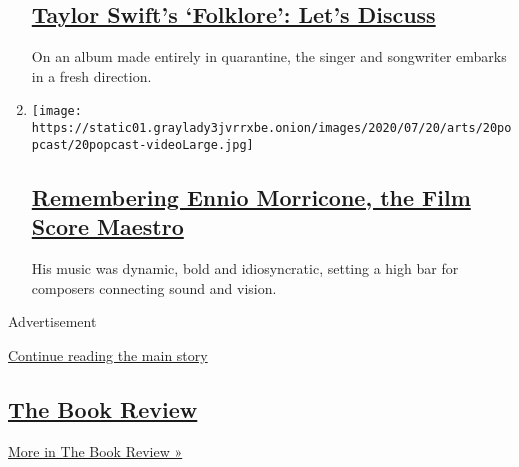 \begin{enumerate}
  \hypertarget{taylor-swifts-folklore-lets-discuss}{%
  \subsection{\texorpdfstring{\href{/2020/07/27/arts/music/popcast-taylor-swift-folklore.html}{Taylor
  Swift's `Folklore': Let's
  Discuss}}{Taylor Swift's `Folklore': Let's Discuss}}\label{taylor-swifts-folklore-lets-discuss}}

  On an album made entirely in quarantine, the singer and songwriter
  embarks in a fresh direction.
\item
  \texttt{[image: https://static01.graylady3jvrrxbe.onion/images/2020/07/20/arts/20popcast/20popcast-videoLarge.jpg]}

  \hypertarget{remembering-ennio-morricone-the-film-score-maestro}{%
  \subsection{\texorpdfstring{\href{/2020/07/20/arts/music/popcast-ennio-morricone.html}{Remembering
  Ennio Morricone, the Film Score
  Maestro}}{Remembering Ennio Morricone, the Film Score Maestro}}\label{remembering-ennio-morricone-the-film-score-maestro}}

  His music was dynamic, bold and idiosyncratic, setting a high bar for
  composers connecting sound and vision.
\end{enumerate}

Advertisement

\protect\hyperlink{after-mid3}{Continue reading the main story}

\hypertarget{the-book-review}{%
\subsection{\texorpdfstring{\href{/column/book-review-podcast}{The Book
Review}}{The Book Review}}\label{the-book-review}}

\href{/column/book-review-podcast}{More in The Book Review »}

